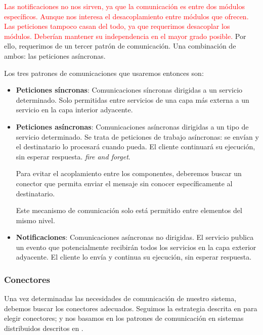 \textcolor{red}{Las notificaciones no nos sirven, ya que la comunicación es entre dos módulos específicos. Aunque nos interesa el desacoplamiento entre módulos que ofrecen. Las peticiones tampoco casan del todo, ya que requerimos desacoplar los módulos. Deberían mantener su independencia en el mayor grado posible.} Por ello, requerimos de un tercer patrón de comunicación. Una combinación de ambos: las peticiones asíncronas.

Los tres patrones de comunicaciones que usaremos entonces son:

\begin{itemize}
  \item \textbf{Peticiones síncronas}: Comunicaciones síncronas dirigidas a un servicio determinado. Solo permitidas entre servicios de una capa más externa a un servicio en la capa interior adyacente.

  \item \textbf{Peticiones asíncronas}: Comunicaciones asíncronas dirigidas a un tipo de servicio determinado. Se trata de peticiones de trabajo asíncronas: se envían y el destinatario lo procesará cuando pueda. El cliente continuará su ejecución, sin esperar respuesta. \emph{fire and forget}.

  Para evitar el acoplamiento entre los componentes, deberemos buscar un conector que permita enviar el mensaje sin conocer específicamente al destinatario.

  Este mecanismo de comunicación solo está permitido entre elementos del mismo nivel.

  \item \textbf{Notificaciones}: Comunicaciones asíncronas no dirigidas. El servicio publica un evento que potencialmente recibirán todos los servicios en la capa exterior adyacente. El cliente lo envía y continua su ejecución, sin esperar respuesta.
\end{itemize}

\subsubsection{Conectores}

Una vez determinadas las necesidades de comunicación de nuestro sistema, debemos buscar los conectores adecuados. Seguimos la estrategia descrita en \cite{taylorSoftwareArchitectureFoundations2009} para elegir conectores; y nos basamos en los patrones de comunicación en sistemas distribuidos descritos en \cite{newmanBuildingMicroservicesDesigning2021}.

